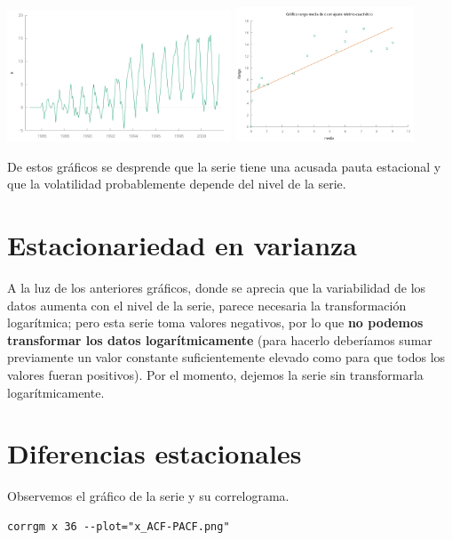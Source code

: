 \documentclass[10pt]{article}
\begin{document}
\begin{center}
\includegraphics[width=0.5\textwidth]{./SegundoEjercicioIdentificacionModeloARIMA/SerieEnNiveles.png}
\includegraphics[width=0.4\textwidth]{./SegundoEjercicioIdentificacionModeloARIMA/rango-media.png} 
\end{center}

De estos gráficos se desprende que la serie tiene una acusada pauta
estacional y que la volatilidad probablemente depende del nivel de la
serie.
\section*{Estacionariedad en varianza}
\label{sec:org6142ddf}

A la luz de los anteriores gráficos, donde se aprecia que la
variabilidad de los datos aumenta con el nivel de la serie, parece
necesaria la transformación logarítmica; pero esta serie toma valores
negativos, por lo que \textbf{no podemos transformar los datos
logarítmicamente} (para hacerlo deberíamos sumar previamente un valor
constante suficientemente elevado como para que todos los valores
fueran positivos). Por el momento, dejemos la serie sin transformarla
logarítmicamente.
\section*{Diferencias estacionales}
\label{sec:orgd530ff7}

Observemos el gráfico de la serie y su correlograma.

\begin{verbatim}
corrgm x 36 --plot="x_ACF-PACF.png"
\end{verbatim}
\end{document}

